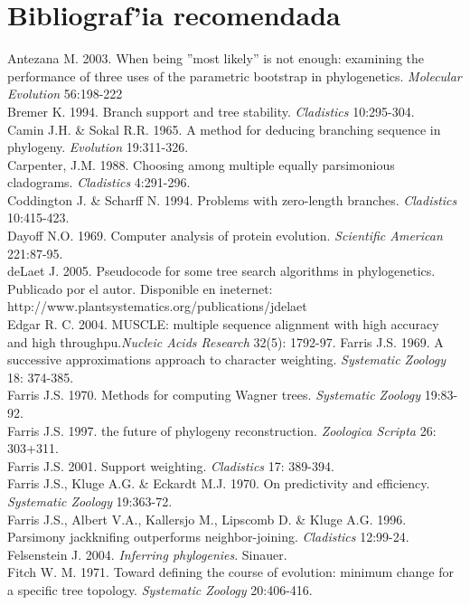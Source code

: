 % 
\renewcommand{\chaptername}{}
\chapter{Bibliograf'ia recomendada}
\noindent
Antezana M. 2003. When being ''most likely'' is not enough: examining the performance of three uses of the parametric bootstrap in phylogenetics. \textit{Molecular Evolution} 56:198-222\\
Bremer K. 1994. Branch support and tree stability. \textit{Cladistics} 10:295-304.\\
Camin J.H. \& Sokal R.R. 1965. A method for deducing branching sequence in phylogeny. \textit{Evolution} 19:311-326.\\
Carpenter, J.M. 1988. Choosing among multiple equally parsimonious cladograms. \textit{Cladistics} 4:291-296.\\
Coddington J. \& Scharff N. 1994. Problems with zero-length branches. \textit{Cladistics} 10:415-423.\\
Dayoff N.O. 1969. Computer analysis of protein evolution. \textit{Scientific American} 221:87-95.\\
deLaet J. 2005. Pseudocode for some tree search algorithms in phylogenetics. Publicado por el autor. Disponible en ineternet: http://www.plantsystematics.org/publications/jdelaet\\
Edgar R. C. 2004.  MUSCLE: multiple sequence alignment with high accuracy and high throughpu.\textit{Nucleic Acids Research} 32(5): 1792-97. 
Farris J.S. 1969. A successive approximations approach to character weighting. \textit{Systematic Zoology} 18: 374-385.\\
Farris J.S. 1970. Methods for computing Wagner trees. \textit{Systematic Zoology} 19:83-92.\\
Farris J.S. 1997. the future of phylogeny reconstruction. \textit{Zoologica Scripta} 26: 303+311.\\
Farris J.S. 2001. Support weighting. \textit{Cladistics} 17: 389-394.\\
Farris J.S., Kluge A.G. \& Eckardt M.J. 1970. On predictivity and efficiency. \textit{Systematic Zoology} 19:363-72.\\
Farris J.S., Albert V.A., Kallersjo M., Lipscomb D. \& Kluge A.G. 1996. Parsimony jackknifing outperforms neighbor-joining. \textit{Cladistics} 12:99-24.\\
Felsenstein J. 2004. \textit{Inferring phylogenies}. Sinauer.\\
Fitch W. M. 1971. Toward defining the course of evolution: minimum change for a specific tree topology. \textit{Systematic Zoology} 20:406-416.\\
